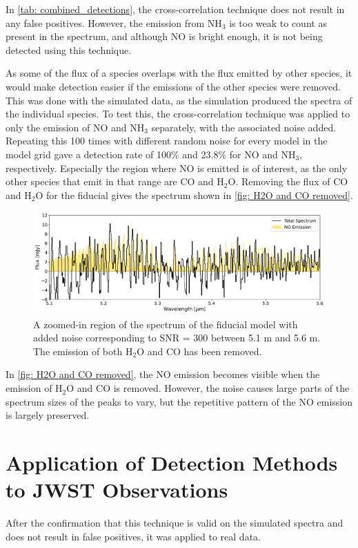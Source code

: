 \documentclass[oneside, single, authoryear, semicolon, 12pt]{lion-msc}
\newcommand{\4}{$_4$}
\newcommand{\3}{$_3$}
\newcommand{\2}{$_2$}
\begin{document}
In \autoref{tab: combined_detections}, the cross-correlation technique does not result in any false positives. However, the emission from NH\3 is too weak to count as present in the spectrum, and although NO is bright enough, it is not being detected using this technique. 

As some of the flux of a species overlaps with the flux emitted by other species, it would make detection easier if the emissions of the other species were removed. This was done with the simulated data, as the simulation produced the spectra of the individual species. To test this, the cross-correlation technique was applied to only the emission of NO and NH\3 separately, with the associated noise added. Repeating this 100 times with different random noise for every model in the model grid gave a detection rate of 100\% and 23.8\% for NO and NH\3, respectively.  Especially the region where NO is emitted is of interest, as the only other species that emit in that range are CO and H\2O. Removing the flux of CO and H\2O for the fiducial gives the spectrum shown in \autoref{fig: H2O and CO removed}.

\begin{figure}[H]
    \centering
    \includegraphics[width=\linewidth]{Figures/H2O_CO_removed.pdf}
    \caption{A zoomed-in region of the spectrum of the fiducial model with added noise corresponding to SNR = 300 between 5.1 \textmu m and 5.6 \textmu m. The emission of both H\2O and CO has been removed.}
    \label{fig: H2O and CO removed}
\end{figure}

In \autoref{fig: H2O and CO removed}, the NO emission becomes visible when the emission of H\2O and CO is removed. However, the noise causes large parts of the spectrum sizes of the peaks to vary, but the repetitive pattern of the NO emission is largely preserved. 

\section{Application of Detection Methods to JWST Observations}
After the confirmation that this technique is valid on the simulated spectra and does not result in false positives, it was applied to real data.
\end{document}
